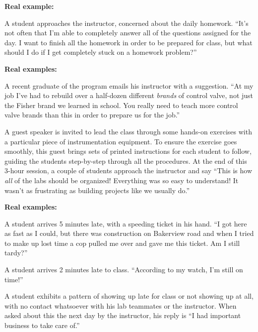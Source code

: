 \vfil \eject
\noindent
{\bf Real example:} 

A student approaches the instructor, concerned about the daily homework.  ``It's not often that I'm able to completely answer all of the questions assigned for the day.  I want to finish all the homework in order to be prepared for class, but what should I do if I get completely stuck on a homework problem?''








\vfil \eject
\noindent
{\bf Real examples:} 

A recent graduate of the program emails his instructor with a suggestion.  ``At my job I've had to rebuild over a half-dozen different {\it brands} of control valve, not just the Fisher brand we learned in school.  You really need to teach more control valve brands than this in order to prepare us for the job.''

\vskip 20pt

A guest speaker is invited to lead the class through some hands-on exercises with a particular piece of instrumentation equipment.  To ensure the exercise goes smoothly, this guest brings sets of printed instructions for each student to follow, guiding the students step-by-step through all the procedures.  At the end of this 3-hour session, a couple of students approach the instructor and say ``This is how {\it all} of the labs should be organized!  Everything was so easy to understand!  It wasn't as frustrating as building projects like we usually do.''









\vfil \eject
\noindent
{\bf Real examples:} 

A student arrives 5 minutes late, with a speeding ticket in his hand.  ``I got here as fast as I could, but there was construction on Bakerview road and when I tried to make up lost time a cop pulled me over and gave me this ticket.  Am I still tardy?''

\vskip 20pt

A student arrives 2 minutes late to class.  ``According to my watch, I'm still on time!''

\vskip 20pt

A student exhibits a pattern of showing up late for class or not showing up at all, with no contact whatsoever with his lab teammates or the instructor.  When asked about this the next day by the instructor, his reply is ``I had important business to take care of.''

